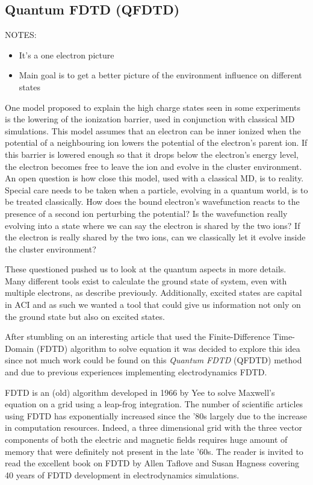 \subsection{Quantum FDTD (QFDTD)}
\label{section:tools:qfdtd}

NOTES:
\begin{itemize}
\item It's a one electron picture
\item Main goal is to get a better picture of the environment influence on
        different states
\end{itemize}



One model proposed to explain the high charge states seen in some experiments
is the lowering of the ionization barrier, used in conjunction with classical
MD simulations. This model assumes that an electron can be inner ionized when
the potential of a neighbouring ion lowers the potential of the electron's
parent ion. If this barrier is lowered enough so that it drops below the
electron's energy level, the electron becomes free to leave the ion and evolve
in the cluster environment. An open question is how close this model, used
with a classical MD, is to reality. Special care needs to be taken when a
particle, evolving in a quantum world, is to be treated classically. How does
the bound electron's wavefunction reacts to the presence of a second ion
perturbing the potential? Is the wavefunction really evolving into a state
where we can say the electron is shared by the two ions? If the electron is
really shared by the two ions, can we classically let it evolve inside the
cluster environment?

These questioned pushed us to look at the quantum aspects in more details. Many
different tools exist to calculate the ground state of system, even with
multiple electrons, as describe previously. Additionally, excited states are
capital in ACI and as such we wanted a tool that could give us information not
only on the ground state but also on excited states.

After stumbling on an interesting article that used the Finite-Difference
Time-Domain (FDTD) algorithm to solve \schrodinger equation\cite{Sudiarta2007}
it was decided to explore this idea since not much work could be found on this
\textit{Quantum FDTD} (QFDTD) method and due to previous experiences
implementing electrodynamics FDTD.

FDTD is an (old) algorithm developed in 1966 by Yee\cite{Yee1966} to solve
Maxwell's equation on a grid using a leap-frog integration. The number of
scientific articles using FDTD has exponentially increased since the '80s
largely due to the increase in computation resources. Indeed, a three
dimensional grid with the three vector components of both the electric and
magnetic fields requires huge amount of memory that were definitely not present
in the late '60s. The reader is invited to read the excellent book on FDTD by
Allen Taflove and Susan Hagness\cite{Taflove2005} covering 40 years of FDTD
development in electrodynamics simulations.

